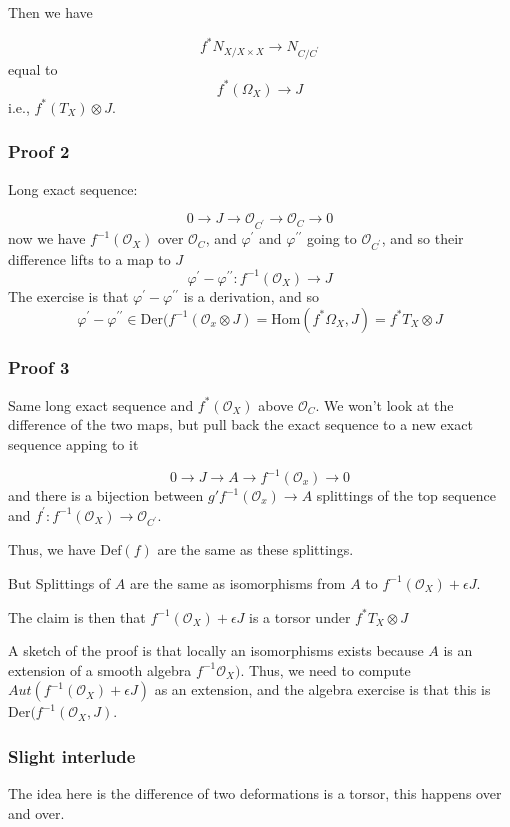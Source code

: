 \documentclass{amsart}
\theoremstyle{definition}
\newcommand{\Def}{\text{Def}}
\newcommand{\OO}{\mathcal{O}}
\newcommand{\Hom}{\text{Hom}}
\newcommand{\Aut}{Aut}
\begin{document}
Then we have

$$f^*N_{X/X\times X} \to N_{C/C^\prime}$$
equal to
$$f^*(\Omega_X)\to J$$
i.e., $f^*(T_X)\otimes J$.

\subsubsection{Proof 2}

Long exact sequence:

$$0\to J \to \OO_{C^\prime}\to \OO_C\to 0$$
now we have $f^{-1}(\OO_X)$ over $\OO_C$, and $\varphi^\prime$ and $\varphi^{\prime\prime}$ going to $\OO_{C^\prime}$, and so their difference lifts to a map to $J$
$$\varphi^{\prime}-\varphi^{\prime\prime}:f^{-1}(\OO_X)\to J$$
The exercise is that $\varphi^\prime-\varphi^{\prime\prime}$ is a derivation, and so
$$\varphi^\prime-\varphi^{\prime\prime}\in \text{Der}(f^{-1}(\OO_x\otimes J)=\Hom(f^*\Omega_X,J)=f^*T_X\otimes J$$


\subsubsection{Proof 3}

Same long exact sequence and $f^*(\OO_X)$ above $\OO_C$.  We won't look at the difference of the two maps, but pull back the exact sequence to a new exact sequence apping to it

$$0\to J\to A\to f^{-1}(\OO_x)\to 0$$
and there is a bijection between $g\prime f^{-1}(\OO_x)\to A$ splittings of the top sequence and $f^\prime:f^{-1}(\OO_X)\to \OO_{C^\prime}$.

Thus, we have $\Def(f)$  are the same as these splittings.

But Splittings of $A$ are the same as isomorphisms from $A$ to $f^{-1}(\OO_X)+\epsilon J$.  

The claim is then that $f^{-1}(\OO_X)+\epsilon J$ is a torsor under $f^*T_X\otimes J$

A sketch of the proof is that locally an isomorphisms exists because $A$ is an extension of a smooth algebra $f^{-1}\OO_X)$.
Thus, we need to compute $\Aut(f^{-1}(\OO_X)+\epsilon J)$ as an extension, and the algebra exercise is that this is $\text{Der}(f^{-1}(\OO_X,J)$.


\subsubsection{Slight interlude}
The idea here is the difference of two deformations is a torsor, this happens over and over.
\end{document}
